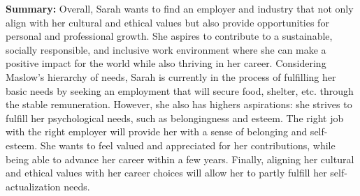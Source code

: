 \noindent\textbf{Summary:}
Overall, Sarah wants to find an employer and industry that not only align with her cultural and ethical values but also provide
opportunities for personal and professional growth. She aspires to contribute to a sustainable, socially responsible, and inclusive
work environment where she can make a positive impact for the world while also thriving in her career. Considering Maslow's hierarchy of needs,
Sarah is currently in the process of fulfilling her basic needs by seeking an employment that will secure food, shelter, etc. through the 
stable remuneration. However, she also has highers aspirations: she strives to fulfill her psychological needs, such as belongingness and
esteem. The right job with the right employer will provide her with a sense of belonging and self-esteem. She wants to feel valued and
appreciated for her contributions, while being able to advance her career within a few years. Finally, aligning her cultural and ethical
values with her career choices will allow her to partly fulfill her self-actualization needs.

